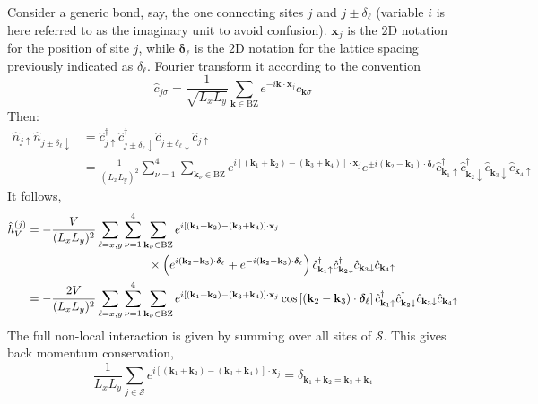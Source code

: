 Consider a generic bond, say, the one connecting sites $j$ and $j\pm\delta_\ell$ (variable $i$ is here referred to as the imaginary unit to avoid confusion). $\mathbf{x}_j$ is the $2$D notation for the position of site $j$, while $\bm{\delta}_\ell$ is the $2$D notation for the lattice spacing previously indicated as $\delta_\ell$. Fourier transform it according to the convention
\[
	\hat c_{j\sigma} = \frac{1}{\sqrt{L_xL_y}} \sum_{\mathbf{k} \in \mathrm{BZ}} e^{-i \mathbf{k} \cdot \mathbf{x}_j} \hat c_{\mathbf{k}\sigma}
\]
Then:
\[
\begin{aligned}
	\hat n_{j\uparrow} \hat n_{j \pm \delta_\ell \downarrow} &= \hat c_{j\uparrow}^\dagger \hat c_{j \pm \delta_\ell \downarrow}^\dagger \hat c_{j \pm \delta_\ell \downarrow} \hat c_{j\uparrow} \\
	&= \frac{1}{(L_xL_y)^2} \sum_{\nu=1}^4 \sum_{\mathbf{k}_\nu \in \mathrm{BZ}} e^{i \left[ (\mathbf{k}_1 + \mathbf{k}_2) - (\mathbf{k}_3 + \mathbf{k}_4) \right] \cdot \mathbf{x}_j} e^{\pm i(\mathbf{k}_2-\mathbf{k}_3) \cdot \bm{\delta}_\ell}  \hat c_{\mathbf{k}_1 \uparrow}^\dagger \hat c_{\mathbf{k}_2 \downarrow}^\dagger \hat c_{\mathbf{k}_3 \downarrow} \hat c_{\mathbf{k}_4\uparrow}
\end{aligned}
\]
It follows,
\[
\begin{aligned}
	\hat h_V^{(j)} &= -\frac{V}{(L_xL_y)^2} \sum_{\ell = x,y} \sum_{\nu=1}^4 \sum_{\mathbf{k}_\nu \in \mathrm{BZ}} e^{i \left[ (\mathbf{k}_1 + \mathbf{k}_2) - (\mathbf{k}_3 + \mathbf{k}_4) \right] \cdot \mathbf{x}_j} \\
	&\hspace{0.3\textwidth} \times \left(
	e^{ i(\mathbf{k}_2-\mathbf{k}_3) \cdot \bm{\delta}_\ell} + e^{ -i(\mathbf{k}_2-\mathbf{k}_3) \cdot \bm{\delta}_\ell} 
	\right)
	\hat c_{\mathbf{k}_1 \uparrow}^\dagger \hat c_{\mathbf{k}_2 \downarrow}^\dagger \hat c_{\mathbf{k}_3 \downarrow} \hat c_{\mathbf{k}_4\uparrow} \\
	&= -\frac{2V}{(L_xL_y)^2} \sum_{\ell = x,y} \sum_{\nu=1}^4 \sum_{\mathbf{k}_\nu \in \mathrm{BZ}} e^{i \left[ (\mathbf{k}_1 + \mathbf{k}_2) - (\mathbf{k}_3 + \mathbf{k}_4) \right] \cdot \mathbf{x}_j} \cos\left[
	(\mathbf{k}_2-\mathbf{k}_3) \cdot \bm{\delta}_\ell
	\right]	\hat c_{\mathbf{k}_1 \uparrow}^\dagger \hat c_{\mathbf{k}_2 \downarrow}^\dagger \hat c_{\mathbf{k}_3 \downarrow} \hat c_{\mathbf{k}_4\uparrow}
\end{aligned}
\]
The full non-local interaction is given by summing over all sites of $\mathcal{S}$. This gives back momentum conservation,
\[
	\frac{1}{L_xL_y} \sum_{j \in \mathcal{S}} e^{i \left[ (\mathbf{k}_1 + \mathbf{k}_2) - (\mathbf{k}_3 + \mathbf{k}_4) \right] \cdot \mathbf{x}_j} = \delta_{\mathbf{k}_1 + \mathbf{k}_2 = \mathbf{k}_3 + \mathbf{k}_4}
\]
